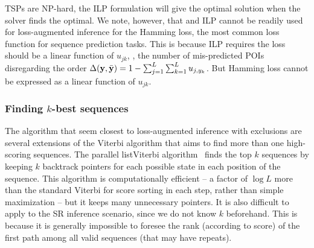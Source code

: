 TSPs are NP-hard, the ILP formulation will give the optimal solution when the solver finds the optimal. 
We note, however, that and ILP cannot be readily used for loss-augmented inference
for the Hamming loss, the most common loss function for sequence prediction tasks. 
This is because ILP requires the loss should be a linear function of $u_{jk}$,
\eg, the number of mis-predicted POIs disregarding the order $\Delta(\mathbf{y}, \bar{\mathbf{y}}) = 1 - \sum_{j=1}^L \sum_{k=1}^L u_{j, y_k}$. 
But Hamming loss cannot be expressed as a linear function of $u_{jk}$.

\subsubsection{Finding $k$-best sequences}

The algorithm that seem closest to loss-augmented inference with exclusions are several extensions 
of the Viterbi algorithm that aims to find more than one high-scoring sequences. 
The parallel listViterbi algorithm~\cite{seshadri1994list} finds the top $k$ sequences 
by keeping $k$ backtrack pointers for each possible state in each position of the sequence. 
This algorithm is computationally efficient 
-- a factor of $\log L$ more than the standard Viterbi for score sorting in each step, rather than simple maximization 
-- but it keeps many unnecessary pointers. It is also difficult to apply to the SR inference scenario, 
since we do not know $k$ beforehand. This is because it is generally impossible to foresee 
the rank (according to score) of the first path among all valid sequences (that may have repeats). 

